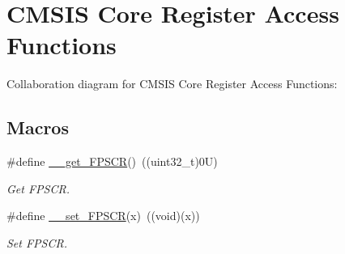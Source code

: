 \hypertarget{group___c_m_s_i_s___core___reg_acc_functions}{}\section{C\+M\+S\+IS Core Register Access Functions}
\label{group___c_m_s_i_s___core___reg_acc_functions}
Collaboration diagram for C\+M\+S\+IS Core Register Access Functions\+:
\subsection*{Macros}
\begin{DoxyCompactItemize}
\item 
\#define \hyperlink{group___c_m_s_i_s___core___reg_acc_functions_ga4d0739b1355ca5642a7ce76df1271f01}{\+\_\+\+\_\+get\+\_\+\+F\+P\+S\+CR}()~((uint32\+\_\+t)0\+U)
\begin{DoxyCompactList}\small\item\em Get F\+P\+S\+CR. \end{DoxyCompactList}\item 
\#define \hyperlink{group___c_m_s_i_s___core___reg_acc_functions_ga3cd91c42ad2793c3f3ae553a1b975512}{\+\_\+\+\_\+set\+\_\+\+F\+P\+S\+CR}(x)~((void)(x))
\begin{DoxyCompactList}\small\item\em Set F\+P\+S\+CR. \end{DoxyCompactList}\end{DoxyCompactItemize}
